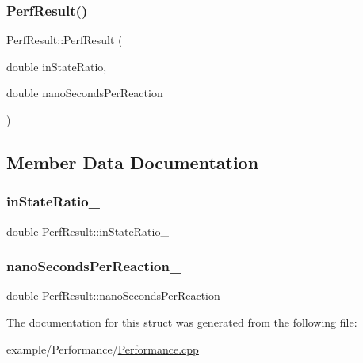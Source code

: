 \subsubsection{\texorpdfstring{Perf\+Result()}{PerfResult()}}
{\footnotesize\ttfamily Perf\+Result\+::\+Perf\+Result (\begin{DoxyParamCaption}\item[{double}]{in\+State\+Ratio,  }\item[{double}]{nano\+Seconds\+Per\+Reaction }\end{DoxyParamCaption})\hspace{0.3cm}{\ttfamily [inline]}}



\subsection{Member Data Documentation}
\mbox{\label{struct_perf_result_a8bbf355b71bf62a72a230a1d3ae14b60}} 
\subsubsection{\texorpdfstring{in\+State\+Ratio\+\_\+}{inStateRatio\_}}
{\footnotesize\ttfamily double Perf\+Result\+::in\+State\+Ratio\+\_\+}

\mbox{\label{struct_perf_result_adec7c1ad5a7ae4c886daaff1bb953426}} 
\subsubsection{\texorpdfstring{nano\+Seconds\+Per\+Reaction\+\_\+}{nanoSecondsPerReaction\_}}
{\footnotesize\ttfamily double Perf\+Result\+::nano\+Seconds\+Per\+Reaction\+\_\+}



The documentation for this struct was generated from the following file\+:\begin{DoxyCompactItemize}
\item 
example/\+Performance/\mbox{\hyperlink{_performance_8cpp}{Performance.\+cpp}}\end{DoxyCompactItemize}
